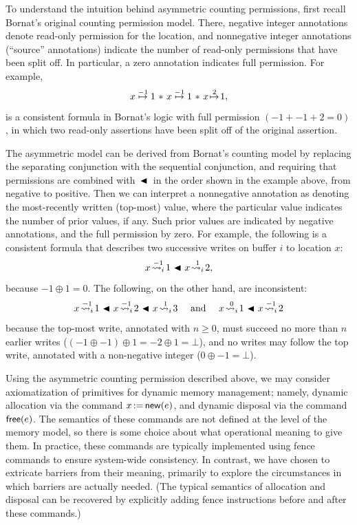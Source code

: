 \documentclass[11pt]{report}
\begin{document}
To understand the intuition behind asymmetric counting permissions, first recall Bornat's original counting permission model. There, negative integer annotations denote read-only permission for the location, and nonnegative integer annotations (``source'' annotations) indicate the number of read-only permissions that have been split off. In particular, a zero annotation indicates full permission. For example, \[ x \stackrel{-1}{\!\mapsto\!} 1 \operatorname{\,\ast\,} x \stackrel{-1}{\!\mapsto\!} 1 \operatorname{\,\ast\,} x \stackrel{2}{\!\mapsto\!} 1, \] is a consistent formula in Bornat's logic with full permission $(-1 + -1 + 2 = 0)$, in which two read-only assertions have been split off of the original assertion.

The asymmetric model can be derived from Bornat's counting model by replacing the separating conjunction with the sequential conjunction, and requiring that permissions are combined with $\operatorname{\,\blacktriangleleft\,}$ in the order shown in the example above, from negative to positive. Then we can interpret a nonnegative annotation as denoting the most-recently written (top-most) value, where the particular value indicates the number of prior values, if any. Such prior values are indicated by negative annotations, and the full permission by zero. For example, the following is a consistent formula that describes two successive writes on buffer $i$ to location $x$: \[ x \stackrel{-1}{\!\leadsto_{i}\!} 1 \operatorname{\,\blacktriangleleft\,} x \stackrel{1}{\!\leadsto_{i}\!} 2 , \] because $-1 \oplus 1 = 0$. The following, on the other hand, are inconsistent: \[ x \stackrel{-1}{\fwrite{i}} 1 \fsseq x \stackrel{-1}{\fwrite{i}} 2 \fsseq x \stackrel{1}{\fwrite{i}} 3 \text{ ~~~and~~~ } x \stackrel{0}{\fwrite{i}} 1 \fsseq x \stackrel{-1}{\fwrite{i}} 2 \] because the top-most write, annotated with $n \geq 0$, must succeed no more than $n$ earlier writes ($(-1 \oplus -1) \oplus 1 = -2 \oplus 1 = \bot$), and no writes may follow the top write, annotated with a non-negative integer ($0 \oplus -1 = \bot$).

Using the asymmetric counting permission described above, we may consider axiomatization of primitives for dynamic memory management; namely, dynamic allocation via the command $x \operatorname{:\!=} \operatorname{\mathsf{new}}(e)$, and dynamic disposal via the command $\operatorname{\mathsf{free}}(e)$. The semantics of these commands are not defined at the level of the memory model, so there is some choice about what operational meaning to give them. In practice, these commands are typically implemented using fence commands to ensure system-wide consistency. In contrast, we have chosen to extricate barriers from their meaning, primarily to explore the circumstances in which barriers are actually needed. (The typical semantics of allocation and disposal can be recovered by explicitly adding fence instructions before and after these commands.)
\end{document}
